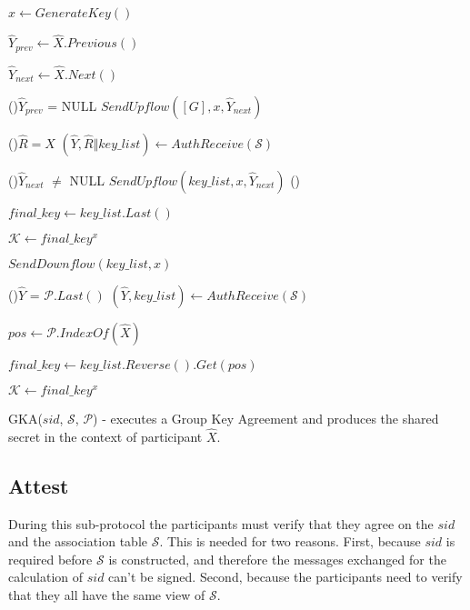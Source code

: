 \begin{algorithm}[H]
  \Begin
  {
    $x \leftarrow GenerateKey()$

    $\hat{Y}_{prev} \leftarrow \hat{X}.Previous()$

    $\hat{Y}_{next} \leftarrow \hat{X}.Next()$   

    \uIf(){$\hat{Y}_{prev}$ = NULL}
    {
      $SendUpflow([G], x, \hat{Y}_{next})$
    }
    \Else
    {
      
      \Repeat(){$\hat{R} = \hat{X}$}
      {
        $(\hat{Y}, \hat{R} \Vert key\_list) \leftarrow AuthReceive(\mathcal{S})$
      }

      {
      }
      \uIf(){$\hat{Y}_{next}$ $\neq$ NULL}
      {
        $SendUpflow(key\_list, x, \hat{Y}_{next})$
      }
      \Else()
      {
        $final\_key \leftarrow key\_list.Last()$

        $\mathcal{K} \leftarrow final\_key^x$

        $SendDownflow(key\_list, x)$

      }
    }

    \Repeat(){$\hat{Y}$ = $\mathcal{P}.Last()$}
    {
      $(\hat{Y}, key\_list) \leftarrow AuthReceive(\mathcal{S})$
    }
    {
    }
    
    $pos \leftarrow \mathcal{P}.IndexOf(\hat{X})$

    $final\_key \leftarrow key\_list.Reverse().Get(pos)$

    $\mathcal{K} \leftarrow final\_key^x$

  }
  \caption{GKA($sid$, $\mathcal{S}$, $\mathcal{P}$) - executes a Group Key Agreement and produces the shared secret in the context of participant $\hat{X}$.}
  \label{gka_proto_algo}
\end{algorithm}

\subsection{Attest}
\label{subsections:attest}
During this sub-protocol the participants must verify that they agree on the $sid$ and the association table $\mathcal{S}$. This is needed for two reasons. First, because $sid$ is required before $\mathcal{S}$ is constructed, and therefore the messages exchanged for the calculation of $sid$ can't be signed. Second, because the participants need to verify that they all have the same view of $\mathcal{S}$.

